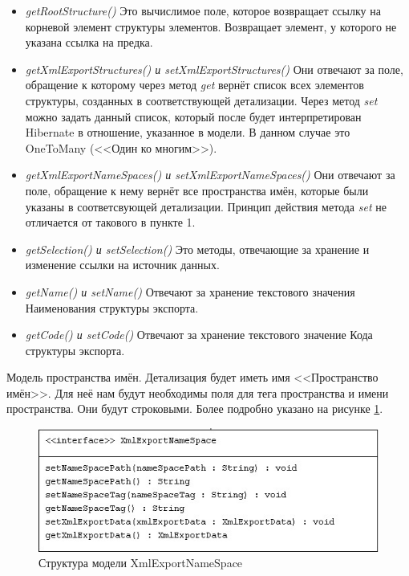 \documentclass[a4paper,12pt]{diplom}
\begin{document}
\begin{itemize}
    \item \textit{getRootStructure()} Это вычислимое поле, которое возвращает ссылку на корневой элемент структуры элементов. Возвращает элемент, у которого не указана ссылка на предка.
    \item \textit{getXmlExportStructures() и setXmlExportStructures()} Они отвечают за поле, обращение к которому через метод \textit{get} вернёт список всех элементов структуры, созданных в соответствующей детализации. Через метод \textit{set} можно задать данный список, который после будет интерпретирован Hibernate в отношение, указанное в модели. В данном случае это OneToMany (<<Один ко многим>>).
    \item \textit{getXmlExportNameSpaces() и setXmlExportNameSpaces()} Они отвечают за поле, обращение к нему вернёт все пространства имён, которые были указаны в соответсвующей детализации. Принцип действия метода \textit{set} не отличается от такового в пункте 1.
    \item \textit{getSelection() и setSelection()} Это методы, отвечающие за хранение и изменение ссылки на источник данных.
    \item \textit{getName() и setName()} Отвечают за хранение текстового значения Наименования структуры экспорта.
    \item \textit{getCode() и setCode()} Отвечают за хранение текстового значение Кода структуры экспорта.
\end{itemize}

Модель пространства имён. Детализация будет иметь имя <<Пространство имён>>. Для неё нам будут необходимы поля для тега пространства и имени пространства. Они будут строковыми. Более подробно указано на рисунке \ref{fig:namespace}.

\begin{figure}[h!]
	\centering
	\includegraphics[width=\textwidth]{imgs/XmlExportNameSpace.jpg}
	\caption{Структура модели XmlExportNameSpace}
	\label{fig:namespace}
\end{figure}
\end{document}

